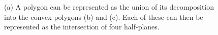 \begin{figure}[b]
{\label{subfig:halfspace}}
\caption[A polygon represented as the union of two convex polygons]{(a) A polygon can be represented as the union of its decomposition into the convex polygons (b) and (c). Each of these can then be represented as the intersection of four half-planes.}
\label{fig:halfspace}
\end{figure}

